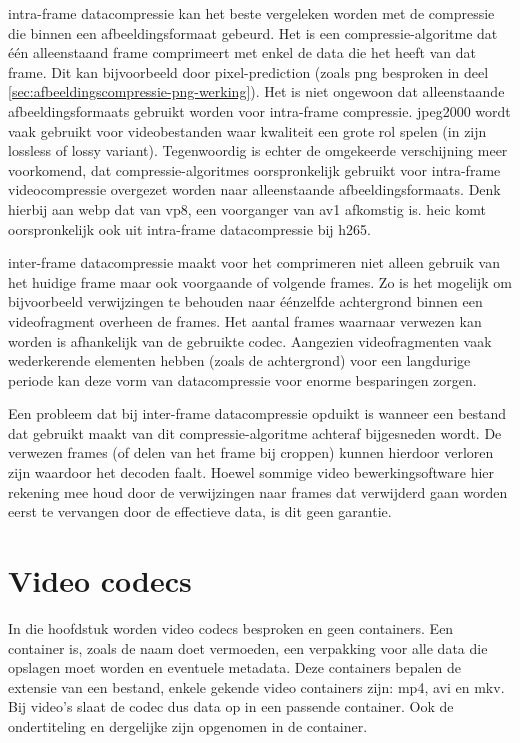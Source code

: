 \Gls{intra-frame} \gls{datacompressie} kan het beste vergeleken worden met de compressie die binnen een \gls{afbeeldingsformaat} gebeurd. Het is een \gls{compressie-algoritme} dat één alleenstaand \gls{frame} comprimeert met enkel de data die het heeft van dat \gls{frame}. Dit kan bijvoorbeeld door \gls{pixel-prediction} (zoals \gls{png} besproken in deel \ref{sec:afbeeldingscompressie-png-werking}). Het is niet ongewoon dat alleenstaande \glspl{afbeeldingsformaat} gebruikt worden voor \gls{intra-frame} compressie. \Gls{jpeg2000} wordt vaak gebruikt voor videobestanden waar kwaliteit een grote rol spelen (in zijn \gls{lossless} of \gls{lossy} variant). Tegenwoordig is echter de omgekeerde verschijning meer voorkomend, dat \glspl{compressie-algoritme} oorspronkelijk gebruikt voor \gls{intra-frame} \gls{videocompressie} overgezet worden naar alleenstaande \glspl{afbeeldingsformaat}. Denk hierbij aan \gls{webp} dat van \gls{vp8}, een voorganger van \gls{av1} afkomstig is. \Gls{heic} komt oorspronkelijk ook uit \gls{intra-frame} \gls{datacompressie} bij \gls{h265}.

\Gls{inter-frame} \gls{datacompressie} maakt voor het comprimeren niet alleen gebruik van het huidige \gls{frame} maar ook voorgaande of volgende \glspl{frame}. Zo is het mogelijk om bijvoorbeeld verwijzingen te behouden naar éénzelfde achtergrond binnen een videofragment overheen de \glspl{frame}. Het aantal \glspl{frame} waarnaar verwezen kan worden is afhankelijk van de gebruikte \gls{codec}. Aangezien videofragmenten vaak wederkerende elementen hebben (zoals de achtergrond) voor een langdurige periode kan deze vorm van \gls{datacompressie} voor enorme besparingen zorgen. 

Een probleem dat bij \gls{inter-frame} \gls{datacompressie} opduikt is wanneer een bestand dat gebruikt maakt van dit \gls{compressie-algoritme} achteraf bijgesneden wordt. De verwezen \glspl{frame} (of delen van het frame bij croppen) kunnen hierdoor verloren zijn waardoor het decoden faalt. Hoewel sommige video bewerkingsoftware hier rekening mee houd door de verwijzingen naar \glspl{frame} dat verwijderd gaan worden eerst te vervangen door de effectieve data, is dit geen garantie.


\section{Video codecs}
\label{sec:videocompressie-video-codecs}

In die hoofdstuk worden video \glspl{codec} besproken en geen \glspl{container}. Een \gls{container} is, zoals de naam doet vermoeden, een verpakking voor alle data die opslagen moet worden en eventuele metadata. Deze containers bepalen de \gls{extensie} van een bestand,  enkele gekende video \glspl{container} zijn: \gls{mp4}, \gls{avi} en \gls{mkv}. Bij video's slaat de \gls{codec} dus data op in een passende \gls{container}. Ook de ondertiteling en dergelijke zijn opgenomen in de \gls{container}.

